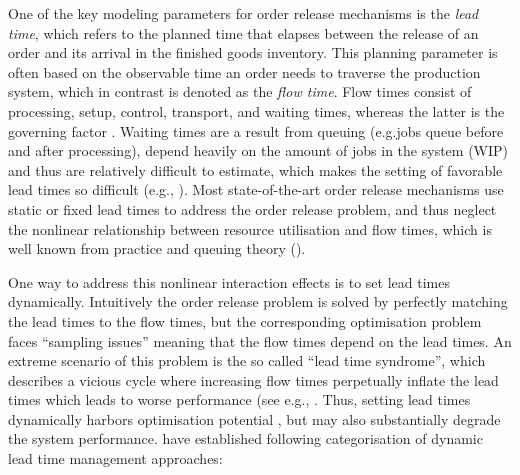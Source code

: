 \documentclass[envcountsame]{llncs}
\begin{document}
One of the key modeling parameters for order release mechanisms is the \textit{lead time}, which
refers to the planned time that elapses between the release of an order and its arrival in the
finished goods inventory. This planning parameter is often based on the observable time an order
needs to traverse the production system, which in contrast is denoted as the \textit{flow time}.
Flow times consist of processing, setup, control, transport, and waiting times, whereas the latter
is the governing factor \citep[][p.223]{zapfel1982produktionswirtschaft}. Waiting times are a result
from queuing (e.g.\@ jobs queue before and after processing), depend heavily on the amount of jobs in
the system (WIP) and thus are relatively difficult to estimate, which makes the
setting of favorable lead times so difficult (e.g., \citealt{Tatsiopoulos1983, Wiendahl1995}). Most
state-of-the-art order release mechanisms use static or fixed lead times to address the order
release problem, and thus neglect the nonlinear relationship between resource utilisation and flow
times, which is well known from practice and queuing theory (\citealt{Pahl2007}).

One way to address this nonlinear interaction effects is to set lead times dynamically. Intuitively
the order release problem is solved by perfectly matching the lead times to the flow times, but the
corresponding optimisation problem faces ``sampling issues'' meaning that the flow times depend on
the lead times. An extreme scenario of this problem is the so called ``lead time syndrome'', which
describes a vicious cycle where increasing flow times perpetually inflate the lead times which leads
to worse performance (see e.g., \citealt{Mather1978, knollmann2013control, Selcuk2006}.
%
Thus, setting lead times dynamically harbors optimisation potential \citep{hoyt1978dynamic}, but may
also substantially degrade the system performance.
%
\citet{schneckenreither2020order} have established
following categorisation of dynamic lead time management approaches:
\end{document}
